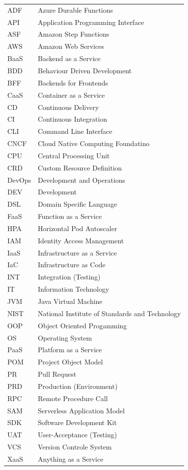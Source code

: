 \documentclass[11pt]{article}
\begin{document}
\begin{tabular}{ p{2cm} p{10cm}} ADF & Azure Durable Functions \\API & Application Programming Interface \\ASF & Amazon Step Functions \\AWS & Amazon Web Services \\BaaS & Backend as a Service \\BDD & Behaviour Driven Development \\BFF & Backends for Frontends \\CaaS & Container as a Service \\  CD & Continuous Delivery \\  CI & Continuous Integration \\CLI & Command Line Interface \\CNCF & Cloud Native Computing Foundatino \\CPU & Central Processing Unit \\CRD & Custom Resource Definition \\DevOps & Development and Operations \\  DEV & Development \\DSL & Domain Specific Language \\FaaS & Function as a Service \\ HPA & Horizontal Pod Autoscaler \\IAM & Identity Access Management \\IaaS & Infrastructure as a Service \\IaC & Infrastructure as Code \\INT & Integration (Testing) \\IT & Information Technology \\JVM & Java Virtual Machine \\NIST & National Institute of Standards and Technology \\OOP & Object Oriented Progamming \\OS & Operating System \\PaaS & Platform as a Service \\POM & Project Object Model \\PR & Pull Request \\PRD & Production (Environment) \\RPC & Remote Procedure Call \\SAM & Serverless Application Model \\SDK & Software Development Kit \\UAT & User-Acceptance (Testing) \\VCS & Version Controle System \\XaaS & Anything as a Service \\
\end{tabular}
\newpage
\tableofcontents
\newpage
\end{document}
